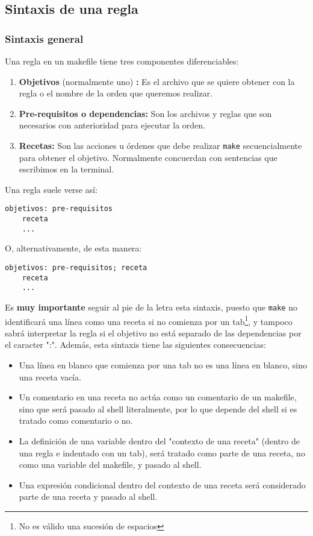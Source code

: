 \documentclass[11pt,twoside,titlepage,a4paper]{article}
\theoremstyle{definition}
\theoremstyle{plain_rojo}
\theoremstyle{remark}
\begin{document}
\subsection{Sintaxis de una regla}

\subsubsection{Sintaxis general}

Una regla en un makefile tiene tres componentes diferenciables:

\begin{enumerate}[font={\color{rojooscuro}\bfseries}]
	\item \textcolor{rojooscuro}{\textbf{Objetivos} (normalmente uno)
	\textbf{:}} Es el archivo que se quiere obtener con la regla o el nombre 
	de la orden que queremos realizar.
	\item \textcolor{rojooscuro}{\textbf{Pre-requisitos o dependencias:}} Son 
	los archivos y reglas que son necesarios con anterioridad para ejecutar 
	la orden.
	\item \textcolor{rojooscuro}{\textbf{Recetas:}} Son las acciones u órdenes
	que debe realizar \texttt{make} secuencialmente para obtener el objetivo. 
	Normalmente concuerdan con sentencias que escribimos en la terminal.
\end{enumerate}
\newpage
Una regla suele verse así:
\bigskip
\begin{lstlisting}
objetivos: pre-requisitos
	receta
	...
\end{lstlisting}
\bigskip
O, alternativamente, de esta manera:
\bigskip
\begin{lstlisting}
objetivos: pre-requisitos; receta
	receta
	...
\end{lstlisting}
\bigskip
Es \textbf{muy importante} seguir al pie de la letra esta sintaxis, puesto
que \texttt{make} no identificará una línea como una receta si no comienza 
por un tab\footnote{No es válido una sucesión de espacios}, y tampoco sabrá 
interpretar la regla si el objetivo no está separado de las dependencias por 
el caracter ":". Además, esta sintaxis tiene las siguientes consecuencias:

\begin{itemize}[font={\color{rojooscuro}\bfseries}]
	\item Una línea en blanco que comienza por una tab no es una línea en 
	blanco, sino una receta vacía.
	\item Un comentario en una receta no actúa como un comentario de un 
	makefile, sino que será pasado al shell literalmente, por lo que depende 
	del shell si es tratado como comentario o no.
	\item La definición de una variable dentro del "contexto de una
	receta" (dentro de una regla e indentado con un tab), será tratado como 
	parte de una receta, no como una variable del makefile, y pasado al shell.
	\item Una expresión condicional dentro del contexto de una receta será 
	considerado parte de una receta y pasado al shell. 
\end{itemize}
\end{document}
